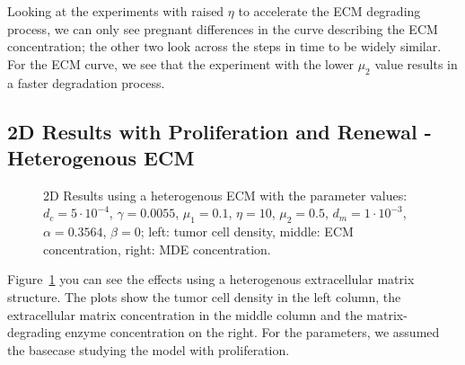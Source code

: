 Looking at the experiments with raised $\eta$ to accelerate the ECM degrading process, we can only see pregnant differences in the curve describing the ECM concentration; the other two look across the steps in time to be widely similar. For the ECM curve, we see that the experiment with the lower $\mu_2$ value results in a faster degradation process.






\subsection{2D Results with Proliferation and Renewal - Heterogenous ECM}
\label{sec:2D_heterogenous_ECM}
\begin{figure}[h!]
 \centering
 \caption{2D Results using a heterogenous ECM with the parameter values: $d_c=5\cdot 10^{-4}$, $\gamma=0.0055$, $\mu_1 = 0.1$, $\eta=10$, $\mu_2=0.5$, $d_m = 1\cdot 10^{-3}$, $\alpha = 0.3564$, $\beta = 0$; left: tumor cell density, middle: ECM concentration, right: MDE concentration.}
 \label{fig:2D_heterogenous_ECM}
\end{figure}
Figure~\ref{fig:2D_heterogenous_ECM} you can see the effects using a heterogenous extracellular matrix structure. The plots show the tumor cell density in the left column, the extracellular matrix concentration in the middle column and the matrix-degrading enzyme concentration on the right. For the parameters, we assumed the basecase studying the model with proliferation. 

